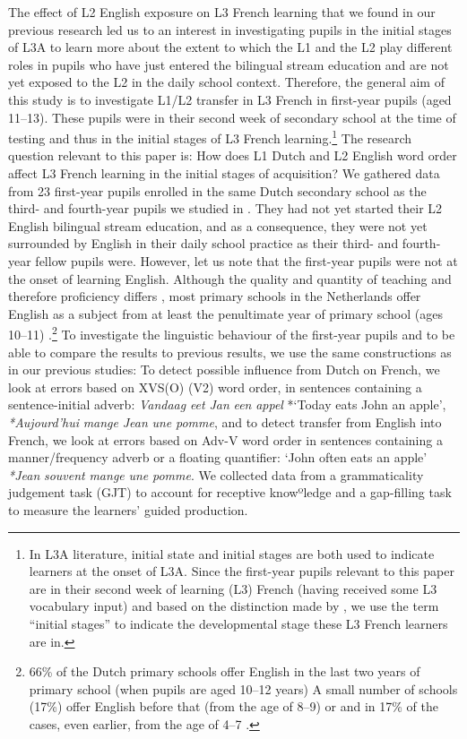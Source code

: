 \documentclass[output=paper]{langsci/langscibook}
\begin{document}
The effect of L2 English exposure on L3 French learning that we found in our previous research led us to an interest in investigating pupils in the initial stages of L3A to learn more about the extent to which the L1 and the L2 play different roles in pupils who have just entered the bilingual stream education and are not yet exposed to the L2 in the daily school context. Therefore, the general aim of this study is to investigate L1/L2 transfer in L3 French in first-year pupils (aged 11–13). These pupils were in their second week of secondary school at the time of testing and thus in the initial stages of L3 French learning.\footnote{In L3A literature, initial state and initial stages are both used to indicate learners at the onset of L3A. Since the first-year pupils relevant to this paper are in their second week of learning (L3) French (having received some L3 vocabulary input) and based on the distinction made by \citet{GarciaMayoRothman2012}, we use the term ``initial stages'' to indicate the developmental stage these L3 French learners are in.} The research question relevant to this paper is: How does L1 Dutch and L2 English word order affect L3 French learning in the initial stages of acquisition? We gathered data from 23 first-year pupils enrolled in the same Dutch secondary school as the third- and fourth-year pupils we studied in \citet{StadtEtAl2016, StadtEtAl2018Exposure}. They had not yet started their L2 English bilingual stream education, and as a consequence, they were not yet surrounded by English in their daily school practice as their third- and fourth-year fellow pupils were. However, let us note that the first-year pupils were not at the onset of learning English. Although the quality and quantity of teaching and therefore proficiency differs \citep{UnsworthEtAl2015}, most primary schools in the Netherlands offer English as a subject from at least the penultimate year of primary school (ages 10–11) \citep{Rose2016}.\footnote{66\% of the Dutch primary schools offer English in the last two years of primary school (when pupils are aged 10–12 years) A small number of schools (17\%) offer English before that (from the age of 8–9) or and in 17\% of the cases, even earlier, from the age of 4–7 \citep{ThijsEtAl2011}.} To investigate the linguistic behaviour of the first-year pupils and to be able to compare the results to previous results, we use the same constructions as in our previous studies: To detect possible influence from Dutch on French, we look at errors based on XVS(O) (V2) word order, in sentences containing a sentence-initial adverb: \textit{Vandaag} {\textit{eet}} \textit{Jan} \textit{een} \textit{appel} *‘Today {eats} John an apple’, \textit{*Aujourd’hui} {\textit{mange}} \textit{Jean} \textit{une} \textit{pomme}, and to detect transfer from English into French, we look at errors based on Adv-V word order in sentences containing a manner/frequency adverb or a floating quantifier: ‘John often {eats} an apple’ \textit{*Jean} \textit{souvent} {\textit{mange}} \textit{une} \textit{pomme}. We collected data from a grammaticality judgement task (GJT) to account for receptive knowºledge and a gap-filling task to measure the learners’ guided production.
\end{document}
